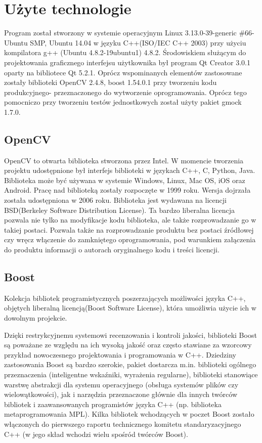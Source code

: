 \documentclass[eng,printmode]{mgr}
\begin{document}
\section{Użyte technologie}

Program został stworzony w systemie operacyjnym Linux 3.13.0-39-generic \#66-Ubuntu SMP, Ubuntu 14.04 w języku C++(ISO/IEC C++ 2003) przy użyciu kompilatora g++ (Ubuntu 4.8.2-19ubuntu1) 4.8.2. Środowiskiem służącym do projektowania graficznego interfejsu użytkownika był program Qt Creator 3.0.1 oparty na bibliotece Qt 5.2.1. Oprócz wspominanych elementów zastosowane zostały biblioteki OpenCV 2.4.8, boost 1.54.0.1 przy tworzeniu kodu produkcyjnego- przeznaczonego do wytworzenie oprogramowania. Oprócz tego pomocniczo przy tworzeniu testów jednostkowych został użyty pakiet gmock 1.7.0.
\subsection{OpenCV}

OpenCV to otwarta biblioteka stworzona przez Intel. W momencie tworzenia projektu udostępnione był interfejs biblioteki w językach C++, C, Python, Java. Biblioteka może być używana w systemie Windows, Linux, Mac OS, iOS oraz Android. Pracę nad biblioteką zostały rozpoczęte w 1999 roku. Wersja dojrzała została udostępniona w 2006 roku. Biblioteka jest wydawana na licencji BSD(Berkeley Software Distribution License). Ta bardzo liberalna licencja pozwala nie tylko na modyfikacje kodu biblioteka, ale także rozprowadzanie go w takiej postaci. Pozwala także na rozprowadzanie produktu bez postaci źródłowej czy wręcz włączenie do zamkniętego oprogramowania, pod warunkiem załączenia do produktu informacji o autorach oryginalnego kodu i treści licencji.
\subsection{Boost}

Kolekcja bibliotek programistycznych poszerzających możliwości języka C++, objętych liberalną licencją(Boost Software License), która umożliwia użycie ich w dowolnym projekcie.

Dzięki restrykcyjnemu systemowi recenzowania i kontroli jakości, biblioteki Boost są poważane ze względu na ich wysoką jakość oraz często stawiane za wzorcowy przykład nowoczesnego projektowania i programowania w C++. Dziedziny zastosowania Boost są bardzo szerokie, pakiet dostarcza m.in. biblioteki ogólnego przeznaczenia (inteligentne wskaźniki, wyrażenia regularne), biblioteki stanowiące warstwę abstrakcji dla systemu operacyjnego (obsługa systemów plików czy wielowątkowości), jak i narzędzia przeznaczone głównie dla innych twórców bibliotek i zaawansowanych programistów języka C++ (np. biblioteka metaprogramowania MPL). Kilka bibliotek wchodzących w poczet Boost zostało włączonych do pierwszego raportu technicznego komitetu standaryzacyjnego C++ (w jego skład wchodzi wielu spośród twórców Boost).\cite{wikiboost}
\end{document}
